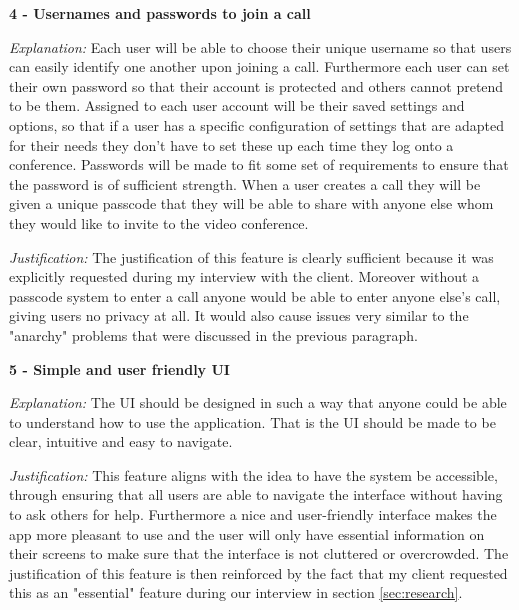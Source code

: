 \vspace{0.2cm}

\textbf{4 - Usernames and passwords to join a call} \\ 
\vspace{0.1cm}

\textit{Explanation:} Each user will be able to choose their unique username so 
that users can easily identify one another upon joining a 
call. Furthermore each user can set their own password so 
that their account is protected and others cannot pretend to 
be them. 
Assigned to each user account will be their saved settings and
options, so that if a user has a specific configuration of 
settings that are adapted for their needs they don't have to 
set these up each time they log onto a conference. Passwords 
will be made to fit some set of requirements to ensure that 
the password is of sufficient strength. When a user creates a 
call they will be given a unique passcode that they will be 
able to share with anyone else whom they would like to invite
to the video conference. \vspace{0.1cm}

\textit{Justification:} The justification of this feature is
clearly sufficient because it was explicitly requested during
my interview with the client. Moreover without a passcode 
system to enter a call anyone would be able to enter anyone
else's call, giving users no privacy at all. It would also 
cause issues very similar to the "anarchy" problems that 
were discussed in the previous paragraph.

\vspace{0.2cm}

\textbf{5 - Simple and user friendly UI} \\ \vspace{0.1cm}

\textit{Explanation:} 
The UI should be designed in such a way that anyone could be 
able to understand how to use the application. That is the UI
should be made to be clear, intuitive and easy to navigate.
\vspace{0.1cm}

\textit{Justification:} 
This feature
aligns with the idea to have the system be accessible,
through ensuring that all users are able to navigate the 
interface without having to ask others for help. Furthermore
a nice and user-friendly interface makes the app more 
pleasant to use and the user will only have essential 
information on their screens
to make sure that the interface is not cluttered or 
overcrowded. The justification of this feature is then 
reinforced by the fact that my client requested this as an 
"essential" feature during our interview
in section \ref{sec:research}. \vspace{0.2cm}

